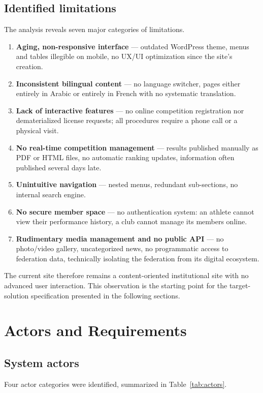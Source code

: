 \documentclass[conference]{IEEEtran}
\begin{document}
\subsection{Identified limitations}
The analysis reveals seven major categories of limitations.

\begin{enumerate}
\item \textbf{Aging, non-responsive interface} — outdated WordPress theme, menus and tables illegible on mobile, no UX/UI optimization since the site's creation.
\item \textbf{Inconsistent bilingual content} — no language switcher, pages either entirely in Arabic or entirely in French with no systematic translation.
\item \textbf{Lack of interactive features} — no online competition registration nor dematerialized license requests; all procedures require a phone call or a physical visit.
\item \textbf{No real-time competition management} — results published manually as PDF or HTML files, no automatic ranking updates, information often published several days late.
\item \textbf{Unintuitive navigation} — nested menus, redundant sub-sections, no internal search engine.
\item \textbf{No secure member space} — no authentication system: an athlete cannot view their performance history, a club cannot manage its members online.
\item \textbf{Rudimentary media management and no public API} — no photo/video gallery, uncategorized news, no programmatic access to federation data, technically isolating the federation from its digital ecosystem.
\end{enumerate}

The current site therefore remains a content-oriented institutional site with no advanced user interaction. This observation is the starting point for the target-solution specification presented in the following sections.

\section{Actors and Requirements}
\subsection{System actors}
Four actor categories were identified, summarized in Table~\ref{tab:actors}.
\end{document}
